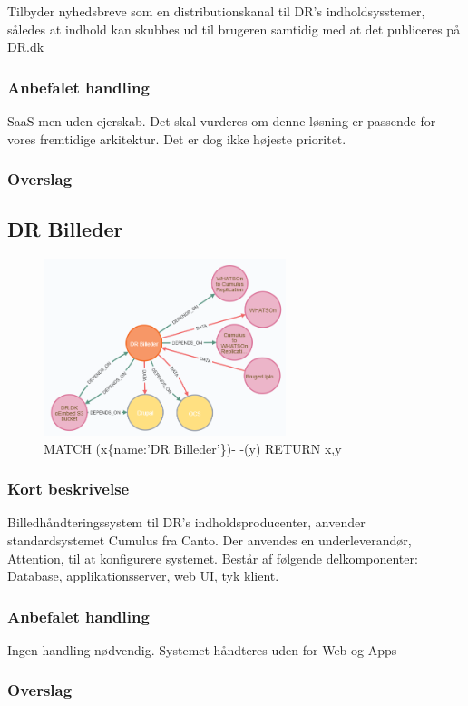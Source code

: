\documentclass{article}
\begin{document}
Tilbyder nyhedsbreve som en distributionskanal til DR's indholdsysstemer, således at indhold kan skubbes ud til brugeren samtidig med at det publiceres på DR.dk
\subsubsection{Anbefalet handling}
SaaS men uden ejerskab. 
Det skal vurderes om denne løsning er passende for vores fremtidige arkitektur. Det er dog ikke højeste prioritet.
\subsubsection{Overslag}


\subsection{DR Billeder}
\begin{figure}[h]
\includegraphics[width=200pt]{DRBilleder.PNG}
\caption{MATCH (x\{name:'DR Billeder'\})- -(y) RETURN x,y}
\end{figure}
\subsubsection{Kort beskrivelse}
Billedhåndteringssystem til DR's indholdsproducenter, anvender standardsystemet Cumulus fra Canto. Der anvendes en underleverandør, Attention, til at konfigurere systemet. Består af følgende delkomponenter: Database, applikationsserver, web UI, tyk klient.
\subsubsection{Anbefalet handling}
Ingen handling nødvendig. Systemet håndteres uden for Web og Apps
\subsubsection{Overslag}
\end{document}
